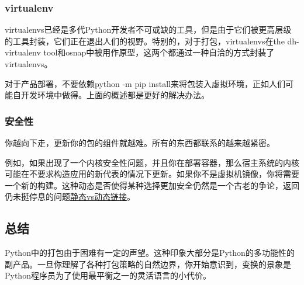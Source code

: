 \documentclass[../package_tutorial.tex]{subfiles}
\begin{document}
\subsubsection{virtualenv}

virtualenvs已经是多代Python开发者不可或缺的工具，但是由于它们被更高层级的工具封装，它们正在退出人们的视野。特别的，对于打包，virtualenvs在the dh-virtualenv tool和osnap中被用作原型，这两个都通过一种自洽的方式封装了virtualenvs。

对于产品部署，不要依赖python -m pip install来将包装入虚拟环境，正如人们可能自开发环境中做得。上面的概述都是更好的解决办法。

\subsubsection{安全性}

你越向下走，更新你的包的组件就越难。所有的东西都联系的越来越紧密。

例如，如果出现了一个内核安全性问题，并且你在部署容器，那么宿主系统的内核可能在不要求构造应用的新代表的情况下更新。如果你不是虚拟机镜像，你将需要一个新的构建。这种动态是否使得某种选择更加安全仍然是一个古老的争论，返回仍未挺停息的问题\href{https://www.google.com/search?channel=fs&q=static+vs+dynamic+linking}{静态vs动态链接}。

\subsection{总结}

Python中的打包由于困难有一定的声望。这种印象大部分是Python的多功能性的副产品。一旦你理解了各种打包策略的自然边界，你开始意识到，变换的景象是Python程序员为了使用最平衡之一的灵活语言的小代价。
\end{document}
